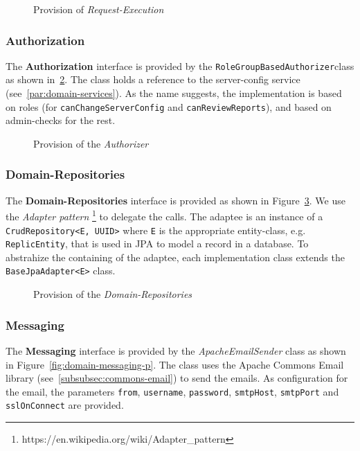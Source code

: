 \begin{figure}
    \centering

    \caption{Provision of \textit{Request-Execution}}
    \label{fig:inter-executors-d}
\end{figure}

\subsubsection{Authorization}
The \textbf{Authorization} interface is provided by the \texttt{RoleGroupBasedAuthorizer}class as shown in~\ref{fig:inter-authorizer-p}.
The class holds a reference to the server-config service (see~\ref{par:domain-services}). \newline
As the name suggests, the implementation is based on roles (for \texttt{canChangeServerConfig} and \texttt{canReviewReports}), and based on admin-checks for the rest.

\begin{figure}
    \centering

    \caption{Provision of the \textit{Authorizer}}
    \label{fig:inter-authorizer-p}
\end{figure}

\subsubsection{Domain-Repositories}
The \textbf{Domain-Repositories} interface is provided as shown in Figure~\ref{fig:domain-repositories-p}.
We use the \textit{Adapter pattern} \footnote{https://en.wikipedia.org/wiki/Adapter\_pattern} to delegate the calls. \newline
The adaptee is an instance of a \texttt{CrudRepository<E, UUID>} where \texttt{E} is the appropriate entity-class, e.g. \texttt{ReplicEntity}, that is used in JPA to model a record in a database.
To abstrahize the containing of the adaptee, each implementation class extends the \texttt{BaseJpaAdapter<E>} class.

\begin{figure}
    \centering

    \caption{Provision of the \textit{Domain-Repositories}}
    \label{fig:domain-repositories-p}
\end{figure}

\subsubsection{Messaging}
The \textbf{Messaging} interface is provided by the \textit{ApacheEmailSender} class as shown in Figure~\ref{fig:domain-messaging-p}.
The class uses the Apache Commons Email library (see~\ref{subsubsec:commons-email}) to send the emails.
As configuration for the email, the parameters \texttt{from}, \texttt{username}, \texttt{password}, \texttt{smtpHost}, \texttt{smtpPort} and \texttt{sslOnConnect} are provided.


